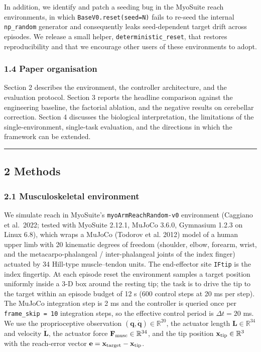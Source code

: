 \documentclass[
  11pt,
]{article}
\begin{document}
In addition, we identify and patch a seeding bug in the MyoSuite reach
environments, in which \texttt{BaseV0.reset(seed=N)} fails to re-seed
the internal \texttt{np\_random} generator and consequently leaks
seed-dependent target drift across episodes. We release a small helper,
\texttt{deterministic\_reset}, that restores reproducibility and that we
encourage other users of these environments to adopt.

\hypertarget{paper-organisation}{%
\subsubsection{1.4 Paper organisation}\label{paper-organisation}}

Section 2 describes the environment, the controller architecture, and
the evaluation protocol. Section 3 reports the headline comparison
against the engineering baseline, the factorial ablation, and the
negative results on cerebellar correction. Section 4 discusses the
biological interpretation, the limitations of the single-environment,
single-task evaluation, and the directions in which the framework can be
extended.

\begin{center}\rule{0.5\linewidth}{0.5pt}\end{center}

\hypertarget{methods}{%
\subsection{2 Methods}\label{methods}}

\hypertarget{musculoskeletal-environment}{%
\subsubsection{2.1 Musculoskeletal
environment}\label{musculoskeletal-environment}}

We simulate reach in MyoSuite's \texttt{myoArmReachRandom-v0}
environment (Caggiano et al.~2022; tested with MyoSuite 2.12.1, MuJoCo
3.6.0, Gymnasium 1.2.3 on Linux 6.8), which wraps a MuJoCo (Todorov et
al. 2012) model of a human upper limb with 20 kinematic degrees of
freedom (shoulder, elbow, forearm, wrist, and the metacarpo-phalangeal /
inter-phalangeal joints of the index finger) actuated by 34 Hill-type
muscle--tendon units. The end-effector site \texttt{IFtip} is the index
fingertip. At each episode reset the environment samples a target
position uniformly inside a 3-D box around the resting tip; the task is
to drive the tip to the target within an episode budget of 12 s (600
control steps at 20 ms per step). The MuJoCo integration step is 2 ms
and the controller is queried once per \texttt{frame\_skip\ =\ 10}
integration steps, so the effective control period is \(\Delta t = 20\)
ms. We use the proprioceptive observation
\((\mathbf{q},\dot{\mathbf{q}}) \in \mathbb{R}^{20}\), the actuator
length \(\mathbf{L} \in \mathbb{R}^{34}\) and velocity
\(\dot{\mathbf{L}}\), the actuator force
\(\mathbf{F}_{\rm musc} \in \mathbb{R}^{34}\), and the tip position
\(\mathbf{x}_{\rm tip} \in \mathbb{R}^{3}\) with the reach-error vector
\(\mathbf{e} = \mathbf{x}_{\rm target} - \mathbf{x}_{\rm tip}\).
\end{document}
